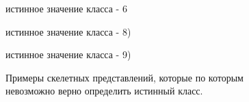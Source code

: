 \documentclass[12pt, twoside]{article}
\begin{document}
\begin{figure}[H]
\begin{minipage}[H]{0.47\linewidth}
 истинное значение класса - 6 \\
\end{minipage}
\vfill
\begin{minipage}[H]{0.47\linewidth}
 истинное значение класса - 8) \\
\end{minipage}
\vfill
\begin{minipage}[H]{0.47\linewidth}
 истинное значение класса - 9) \\
\end{minipage}
\caption{Примеры скелетных представлений, которые по которым невозможно верно определить истинный класс.}
\label{incorrect_input}
\end{figure}





\end{document}
